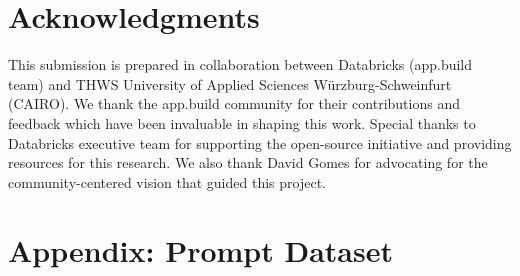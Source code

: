 \documentclass[conference]{IEEEtran}
\begin{document}
\section*{Acknowledgments}

This submission is prepared in collaboration between Databricks (app.build team) and THWS University of Applied Sciences Würzburg-Schweinfurt (CAIRO). We thank the app.build community for their contributions and feedback which have been invaluable in shaping this work. Special thanks to Databricks executive team for supporting the open-source initiative and providing resources for this research. We also thank David Gomes for advocating for the community-centered vision that guided this project.





\section*{Appendix: Prompt Dataset}
\label{sec:prompt-dataset}
\end{document}
